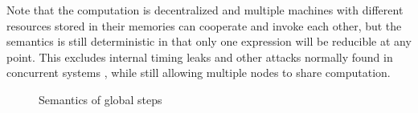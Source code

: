 Note that the computation is decentralized and multiple machines with different resources stored in their memories can cooperate and invoke each other, but the semantics is still deterministic in that only one expression will be reducible at any point. This excludes internal timing leaks and other attacks normally found in concurrent systems \cite{Smith:1998:SIF:268946.268975, Muller:2012:TPS:2384616.2384621}, while still allowing multiple nodes to share computation.

\begin{figure*}
\centering
{}
\caption{Semantics of global steps}
\label{fig:global-steps}
\end{figure*}

